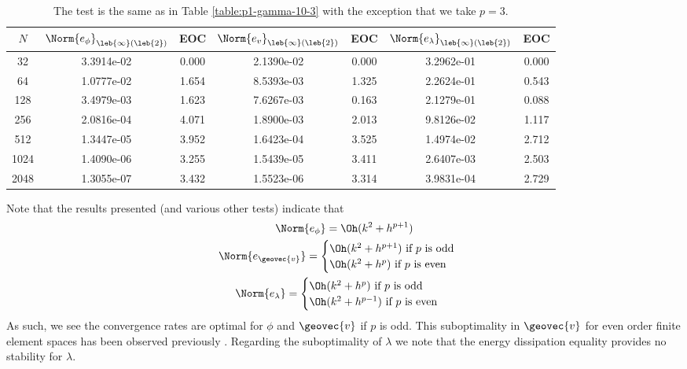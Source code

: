 \documentclass[final]{amsart}
\numberwithin{equation}{section}
\begin{document}
\begin{table}
  \caption{\label{table:p3-gamma-10-3} The test is the same as in
    Table \ref{table:p1-gamma-10-3} with the exception that
    we take $p=3$.}
  \begin{center}
    
\begin{tabular}{c|c|c|c|c|c|c}
$N$ & $\Norm{e_\phi}_{\leb{\infty}(\leb{2})}$ & EOC & $\Norm{e_v}_{\leb{\infty}(\leb{2})}$ & EOC & $\Norm{e_\lambda}_{\leb{\infty}(\leb{2})}$ & EOC \\
\hline
32 & 3.3914e-02 & 0.000 & 2.1390e-02 & 0.000 & 3.2962e-01 & 0.000 \\
64 & 1.0777e-02 & 1.654 & 8.5393e-03 & 1.325 & 2.2624e-01 & 0.543 \\
128 & 3.4979e-03 & 1.623 & 7.6267e-03 & 0.163 & 2.1279e-01 & 0.088 \\
256 & 2.0816e-04 & 4.071 & 1.8900e-03 & 2.013 & 9.8126e-02 & 1.117 \\
512 & 1.3447e-05 & 3.952 & 1.6423e-04 & 3.525 & 1.4974e-02 & 2.712 \\
1024 & 1.4090e-06 & 3.255 & 1.5439e-05 & 3.411 & 2.6407e-03 & 2.503 \\
2048 & 1.3055e-07 & 3.432 & 1.5523e-06 & 3.314 & 3.9831e-04 & 2.729 \\
\end{tabular}

  \end{center}
\end{table}
\begin{Rem}
  Note that the results presented (and various other tests) indicate
  that
  \begin{gather}
    \Norm{e_\phi} = \Oh(k^2 + h^{p+1})
    \\
    \Norm{e_{{\geovec{v}}}} = 
    \begin{cases}
      \Oh(k^2 + h^{p+1}) \text{ if } p \text { is odd }
      \\
      \Oh(k^2 + h^{p}) \text{ if } p \text { is even }
    \end{cases}
    \\
    \Norm{e_\lambda} = 
    \begin{cases}
      \Oh(k^2 + h^{p}) \text{ if } p \text{ is odd }
      \\
      \Oh(k^2 + h^{p-1}) \text{ if } p \text{ is even }
    \end{cases}
  \end{gather}
  As such, we see the convergence rates are optimal for $\phi$ and
  ${\geovec{v}}$ if $p$ is odd. This suboptimality in ${\geovec{v}}$ for even
  order finite element spaces has been observed previously
  \cite{GiesselmannMakridakisPryer:2012}. Regarding the suboptimality
  of $\lambda$ we note that the energy dissipation equality provides
  no stability for $\lambda.$
\end{Rem}
\end{document}
